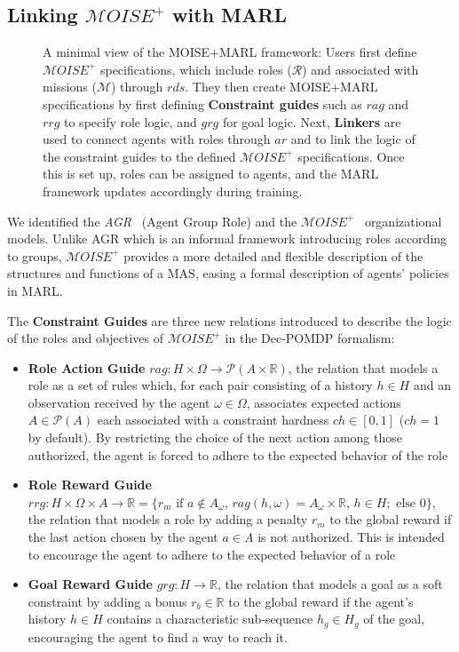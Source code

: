 \documentclass[pdflatex,sn-mathphys-num]{sn-jnl}%
\theoremstyle{thmstyleone}%
\theoremstyle{thmstyletwo}%
\theoremstyle{thmstylethree}%
\begin{document}
\subsection{Linking $\mathcal{M}OISE^+$ with MARL}

\begin{figure}[h!]
    \centering
    
    \caption{A minimal view of the MOISE+MARL framework: 
    Users first define $\mathcal{M}OISE^+$ specifications, which include roles ($\mathcal{R}$) and associated with missions ($\mathcal{M}$) through $rds$. They then create MOISE+MARL specifications by first defining \textbf{Constraint guides} such as $rag$ and $rrg$ to specify role logic, and $grg$ for goal logic. 
    Next, \textbf{Linkers} are used to connect agents with roles through $ar$ and to link the logic of the constraint guides to the defined $\mathcal{M}OISE^+$ specifications. Once this is set up, roles can be assigned to agents, and the MARL framework updates accordingly during training.
    }
    \label{fig:mm_synthesis}
\end{figure}

We identified the \textit{AGR}~\cite{ferber2003} (Agent Group Role) and the $\mathcal{M}OISE^+$~\citep{Hubner2007} organizational models. Unlike AGR which is an informal framework introducing roles according to groups, $\mathcal{M}OISE^+$ provides a more detailed and flexible description of the structures and functions of a MAS, easing a formal description of agents' policies in MARL.

\noindent The \textbf{Constraint Guides} are three new relations introduced to describe the logic of the roles and objectives of $\mathcal{M}OISE^+$ in the Dec-POMDP formalism:
%
\begin{itemize}
    \item \textbf{Role Action Guide} \quad $rag: H \times \Omega \rightarrow \mathcal{P}(A \times \mathbb{R})$, the relation that models a role as a set of rules which, for each pair consisting of a history $h \in H$ and an observation received by the agent $\omega \in \Omega$, associates expected actions $A \in \mathcal{P}(A)$ each associated with a constraint hardness $ch \in [0,1]$ ($ch = 1$ by default). By restricting the choice of the next action among those authorized, the agent is forced to adhere to the expected behavior of the role
    \item \textbf{Role Reward Guide} \quad $rrg: H \times \Omega \times A \to \mathbb{R} = \{r_m \text{ if } a \notin A_\omega \text{, } rag(h, \omega) = A_\omega \times \mathbb{R} \text{, } h \in H; \text{ else } 0\}$, the relation that models a role by adding a penalty $r_m$ to the global reward if the last action chosen by the agent $a \in A$ is not authorized. This is intended to encourage the agent to adhere to the expected behavior of a role
    \item \textbf{Goal Reward Guide} \quad $grg: H \rightarrow \mathbb{R}$, the relation that models a goal as a soft constraint by adding a bonus $r_b \in \mathbb{R}$ to the global reward if the agent's history $h \in H$ contains a characteristic sub-sequence $h_g \in H_g$ of the goal, encouraging the agent to find a way to reach it.
\end{itemize}
\end{document}
